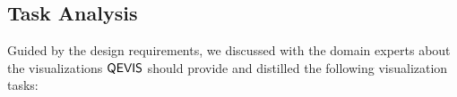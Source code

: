 %
%  
%  
%  
%
%


\subsection{Task Analysis}
Guided by the design requirements, we discussed with the domain experts about the visualizations $\mathsf{QEVIS}$ should provide and distilled the following visualization tasks:

